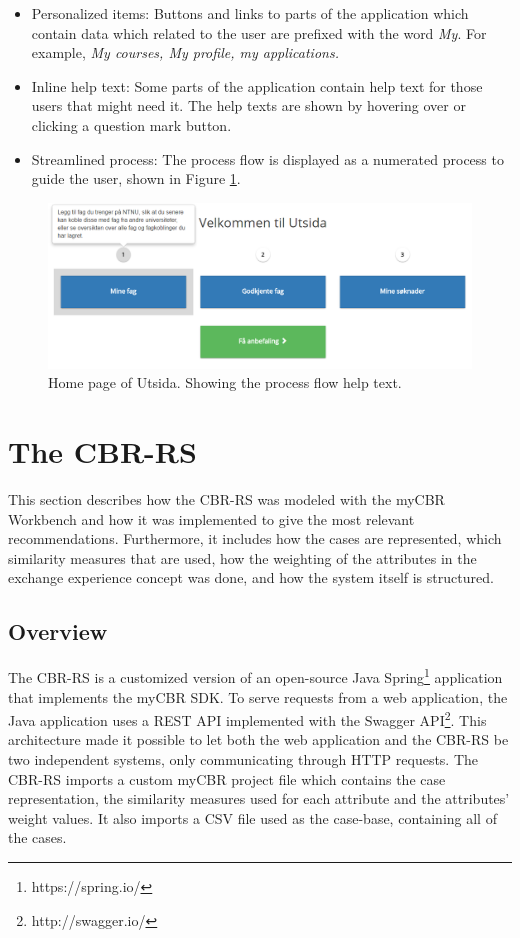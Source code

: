 \begin{itemize}
    \item Personalized items: Buttons and links to parts of the application which contain data which related to the user are prefixed with the word \emph{My}. For example, \emph{My courses, My profile, my applications.}
    \item Inline help text: Some parts of the application contain help text for those users that might need it. The help texts are shown by hovering over or clicking a question mark button. 
    \item Streamlined process: The process flow is displayed as a numerated process to guide the user, shown in Figure \ref{fig:utsida_index}.
\end{itemize}

\begin{figure}[h]
    \centering
    \includegraphics[width=1\textwidth]{fig/utsida_screenshots/steps.png}
    \caption[Home page of Utsida]{Home page of Utsida. Showing the process flow help text.}
    \label{fig:utsida_index}
\end{figure}

\section{The CBR-RS}

This section describes how the CBR-RS was modeled with the myCBR Workbench and how it was implemented to give the most relevant recommendations. Furthermore, it includes how the cases are represented, which similarity measures that are used, how the weighting of the attributes in the exchange experience concept was done, and how the system itself is structured.

    \subsection{Overview}

The CBR-RS is a customized version of an open-source Java Spring\footnote{https://spring.io/} application that implements the myCBR SDK. To serve requests from a web application, the Java application uses a REST API implemented with the Swagger API\footnote{http://swagger.io/}. This architecture made it possible to let both the web application and the CBR-RS be two independent systems, only communicating through HTTP requests. The CBR-RS imports a custom myCBR project file which contains the case representation, the similarity measures used for each attribute and the attributes' weight values. It also imports a CSV file used as the case-base, containing all of the cases.

